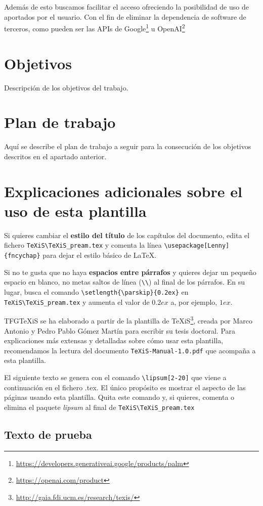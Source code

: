 Además de esto buscamos facilitar el acceso ofreciendo la posibilidad de uso de \mgl aportados por el usuario. Con el fin de eliminar la dependencia de software de terceros, como pueden ser las APIs de Google\footnote{\url{https://developers.generativeai.google/products/palm}} u OpenAI\footnote{\url{https://openai.com/product}}


\section{Objetivos}
Descripción de los objetivos del trabajo.


\section{Plan de trabajo}
Aquí se describe el plan de trabajo a seguir para la consecución de los objetivos descritos en el apartado anterior.



\section{Explicaciones adicionales sobre el uso de esta plantilla}
Si quieres cambiar el \textbf{estilo del título} de los capítulos del documento, edita el fichero \verb|TeXiS\TeXiS_pream.tex| y comenta la línea \verb|\usepackage[Lenny]{fncychap}| para dejar el estilo básico de \LaTeX.

Si no te gusta que no haya \textbf{espacios entre párrafos} y quieres dejar un pequeño espacio en blanco, no metas saltos de línea (\verb|\\|) al final de los párrafos. En su lugar, busca el comando  \verb|\setlength{\parskip}{0.2ex}| en \verb|TeXiS\TeXiS_pream.tex| y aumenta el valor de $0.2ex$ a, por ejemplo, $1ex$.

TFGTeXiS se ha elaborado a partir de la plantilla de TeXiS\footnote{\url{http://gaia.fdi.ucm.es/research/texis/}}, creada por Marco Antonio y Pedro Pablo Gómez Martín para escribir su tesis doctoral. Para explicaciones más extensas y detalladas sobre cómo usar esta plantilla, recomendamos la lectura del documento \texttt{TeXiS-Manual-1.0.pdf} que acompaña a esta plantilla.

El siguiente texto se genera con el comando \verb|\lipsum[2-20]| que viene a continuación en el fichero .tex. El único propósito es mostrar el aspecto de las páginas usando esta plantilla. Quita este comando y, si quieres, comenta o elimina el paquete \textit{lipsum} al final de \verb|TeXiS\TeXiS_pream.tex|

\subsection{Texto de prueba}


\lipsum[2-20]